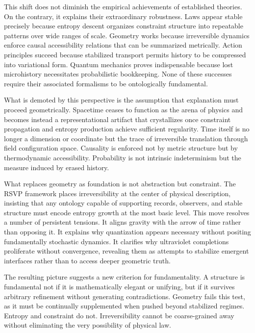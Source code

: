 \documentclass[11pt]{article}
\begin{document}
This shift does not diminish the empirical achievements of established theories. On the contrary, it explains their extraordinary robustness. Laws appear stable precisely because entropy descent organizes constraint structure into repeatable patterns over wide ranges of scale. Geometry works because irreversible dynamics enforce causal accessibility relations that can be summarized metrically. Action principles succeed because stabilized transport permits history to be compressed into variational form. Quantum mechanics proves indispensable because lost microhistory necessitates probabilistic bookkeeping. None of these successes require their associated formalisms to be ontologically fundamental.

What is demoted by this perspective is the assumption that explanation must proceed geometrically. Spacetime ceases to function as the arena of physics and becomes instead a representational artifact that crystallizes once constraint propagation and entropy production achieve sufficient regularity. Time itself is no longer a dimension or coordinate but the trace of irreversible translation through field configuration space. Causality is enforced not by metric structure but by thermodynamic accessibility. Probability is not intrinsic indeterminism but the measure induced by erased history.

What replaces geometry as foundation is not abstraction but constraint. The RSVP framework places irreversibility at the center of physical description, insisting that any ontology capable of supporting records, observers, and stable structure must encode entropy growth at the most basic level. This move resolves a number of persistent tensions. It aligns gravity with the arrow of time rather than opposing it. It explains why quantization appears necessary without positing fundamentally stochastic dynamics. It clarifies why ultraviolet completions proliferate without convergence, revealing them as attempts to stabilize emergent interfaces rather than to access deeper geometric truth.

The resulting picture suggests a new criterion for fundamentality. A structure is fundamental not if it is mathematically elegant or unifying, but if it survives arbitrary refinement without generating contradictions. Geometry fails this test, as it must be continually supplemented when pushed beyond stabilized regimes. Entropy and constraint do not. Irreversibility cannot be coarse-grained away without eliminating the very possibility of physical law.
\end{document}
